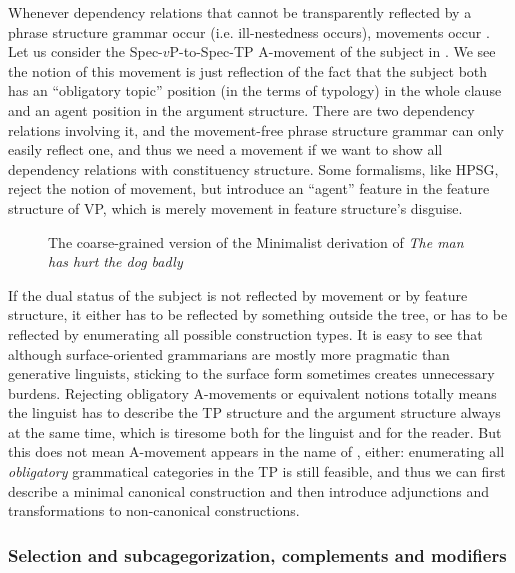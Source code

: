 \documentclass[../main.tex]{subfiles}
\begin{document}
Whenever dependency relations that cannot be transparently reflected by a phrase structure grammar occur
(i.e. ill-nestedness occurs), movements occur \citep{boston2009dependency}. 
Let us consider the Spec-$v$P-to-Spec-TP A-movement of the subject in . We see the notion of this movement is just reflection of the fact 
that the subject both has an ``obligatory topic'' position (in the terms of typology) in the whole clause 
and an agent position in the argument structure. There are two dependency relations involving it, and 
the movement-free phrase structure grammar can only easily reflect one, and thus we need a movement 
if we want to show all dependency relations with constituency structure. Some formalisms, like HPSG,
reject the notion of movement, but introduce an ``agent'' feature in the feature structure of 
VP, which is merely movement in feature structure's disguise. 

\begin{figure}
    \centering
    
    \caption{The coarse-grained version of the Minimalist derivation of \emph{The man has hurt the dog badly}}
    \label{fig:coarse-grained-hurt-the-dog-badly}
\end{figure}

If the dual status of the subject is not reflected by movement or by feature structure, 
it either has to be reflected by something outside the tree, 
or has to be reflected by enumerating all possible construction types. 
It is easy to see that although surface-oriented grammarians are mostly more pragmatic than generative linguists, 
sticking to the surface form sometimes creates unnecessary burdens. 
Rejecting obligatory A-movements or equivalent notions totally means the linguist has to 
describe the TP structure and the argument structure always at the same time, 
which is tiresome both for the linguist and for the reader. 
But this does not mean A-movement appears in the name of , either:
enumerating all \emph{obligatory} grammatical categories in the TP
is still feasible,
and thus we can first describe a minimal canonical construction 
and then introduce adjunctions and transformations to non-canonical constructions.

\subsubsection{Selection and subcagegorization, complements and modifiers}\label{sec:sub-cat}
\end{document}
